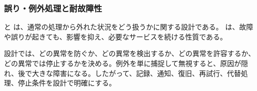 \subsubsection{誤り・例外処理と耐故障性}

 と は、通常の処理から外れた状況をどう扱うかに関する設計である。 は、故障や誤りが起きても、影響を抑え、必要なサービスを続ける性質である。

設計では、どの異常を防ぐか、どの異常を検出するか、どの異常を許容するか、どの異常では停止するかを決める。例外を単に捕捉して無視すると、原因が隠れ、後で大きな障害になる。したがって、記録、通知、復旧、再試行、代替処理、停止条件を設計で明確にする。
